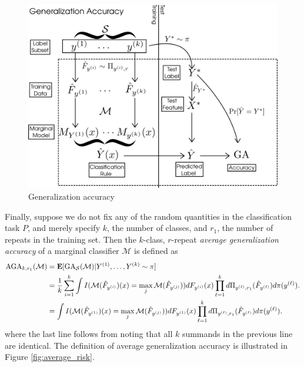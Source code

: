 \begin{figure}[h]
\centering
\includegraphics[scale = 0.3]{../extrapolation_simple/risk.png}
\caption{Generalization accuracy}\label{fig:risk}
\end{figure}

Finally, suppose we do not fix any of the random quantities in the
classification task $P$, and merely specify $k$, the number of
classes, and $r_1$, the number of repeats in the training set.  
Then the $k$-class, $r$-repeat \emph{average generalization accuracy} of
a marginal classifier $\mathcal{M}$ is defined as
\begin{align*}
\text{AGA}_{k,r_1}(\mathcal{M}) &= \textbf{E}[\text{GA}_{\mathcal{S}}(\mathcal{M})|Y^{(1)}, \hdots, Y^{(k)} \sim \pi]
\\&= \frac{1}{k} \sum_{i=1}^k \int
I(\mathcal{M}(\hat{F}_{y^{(i)}})(x) = \max_j
\mathcal{M}(\hat{F}_{y^{(j)}})) dF_{y^{(i)}}(x) \prod_{\ell=1}^k
d\Pi_{y^{(\ell)}, r_1}(\hat{F}_{y^{(\ell)}}) d\pi(y^{(\ell)}).
\\&= \int
I(\mathcal{M}(\hat{F}_{y^{(1)}})(x) = \max_j
\mathcal{M}(\hat{F}_{y^{(j)}})) dF_{y^{(1)}}(x) \prod_{\ell=1}^k
d\Pi_{y^{(\ell)}, r_1}(\hat{F}_{y^{(\ell)}}) d\pi(y^{(\ell)}).
\end{align*}
where the last line follows from noting that all $k$ summands in the previous line are identical.
The definition of average generalization accuracy is illustrated in Figure \ref{fig:average_risk}.

